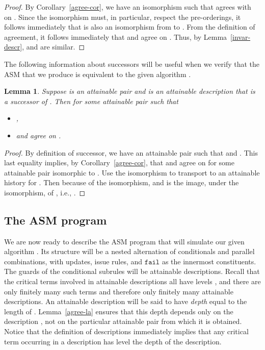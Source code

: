 \documentclass{LMCS}
\newtheorem{la}[thm]{Lemma}
\theoremstyle{definition}
\newenvironment{ls}{\begin{itemize}}{\end{itemize}}
\newcommand{\ttt}[1]{\ensuremath{\mathtt {#1}}}
\begin{document}
\begin{proof}
By Corollary~\ref{agree-cor}, we have an isomorphism
 such that  agrees with 
on .  Since the isomorphism  must, in particular, respect the
pre-orderings, it follows immediately that  is also an isomorphism
from  to .  From the definition of agreement, it
follows immediately that  and  agree on .
Thus, by Lemma~\ref{invar-descr},  and  are
similar.
\end{proof}

The following information about successors will be useful when we
verify that the ASM that we produce is equivalent to the given
algorithm .

\begin{la}   \label{successor}
  Suppose  is an attainable pair and  is an
  attainable description that is a successor of .
  Then  for some attainable pair 
  such that
  \begin{ls}
    \item ,
    \item  and  agree on .
  \end{ls}
\end{la}

\begin{proof}
By definition of successor, we have an attainable pair 
such that  and
.  This last equality implies, by
Corollary~\ref{agree-cor}, that  and  agree on 
for some attainable pair  isomorphic to .  Use
the isomorphism to transport  to an attainable history 
for .  Then  because of
the isomorphism, and  is the image, under the isomorphism, of
, i.e., .
\end{proof}

\subsection{The ASM program}

We are now ready to describe the ASM program that will simulate our
given algorithm .  Its structure will be a nested alternation of
conditionals and parallel combinations, with updates, issue rules, and
\ttt{fail} as the innermost constituents.  The guards of the
conditional subrules will be attainable descriptions.  Recall that the
critical terms involved in attainable descriptions all have levels
, and there are only finitely many such terms and therefore
only finitely many attainable descriptions.  An attainable description
 will be said to have \emph{depth} equal to the length
of .  Lemma~\ref{agree-la} ensures that this depth depends only
on the description , not on the particular attainable
pair  from which it is obtained.  Notice that the definition
of descriptions immediately implies that any critical term occurring
in a description has level  the depth of the description.
\end{document}
